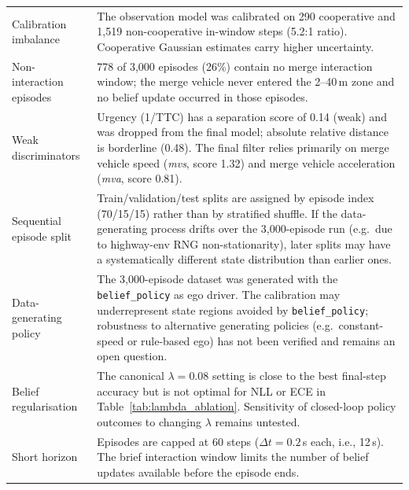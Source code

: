 \begin{table}[htbp]
\begin{tabular}{p{3.4cm}p{9.0cm}}
Calibration imbalance
  & The observation model was calibrated on 290 cooperative and 1{,}519
    non-cooperative in-window steps (5.2:1 ratio). Cooperative Gaussian
    estimates carry higher uncertainty. \\
Non-interaction episodes
  & 778 of 3{,}000 episodes (26\%) contain no merge interaction window;
    the merge vehicle never entered the 2--40\,m zone and no belief update
    occurred in those episodes. \\
Weak discriminators
  & Urgency (1/TTC) has a separation score of 0.14 (weak) and was dropped
    from the final model; absolute relative distance is borderline (0.48).
    The final filter relies primarily on merge vehicle speed (\emph{mvs},
    score 1.32) and merge vehicle acceleration (\emph{mva}, score 0.81). \\
Sequential episode split
  & Train/validation/test splits are assigned by episode index (70/15/15)
    rather than by stratified shuffle.
    If the data-generating process drifts over the 3{,}000-episode run
    (e.g.\ due to highway-env RNG non-stationarity), later splits may have
    a systematically different state distribution than earlier ones. \\
Data-generating policy
  & The 3{,}000-episode dataset was generated with the \texttt{belief\_policy}
    as ego driver.
    The calibration may underrepresent state regions avoided by
    \texttt{belief\_policy}; robustness to alternative generating policies
    (e.g.\ constant-speed or rule-based ego) has not been verified and remains
    an open question. \\
Belief regularisation
  & The canonical $\lambda{=}0.08$ setting is close to the best final-step
    accuracy but is not optimal for NLL or ECE in Table~\ref{tab:lambda_ablation}.
    Sensitivity of closed-loop policy outcomes to changing $\lambda$ remains
    untested. \\
Short horizon
  & Episodes are capped at 60 steps ($\Delta t{=}0.2$\,s each, i.e., 12\,s).
    The brief interaction window limits the number of belief updates available
    before the episode ends. \\
\bottomrule
\end{tabular}
\end{table}
